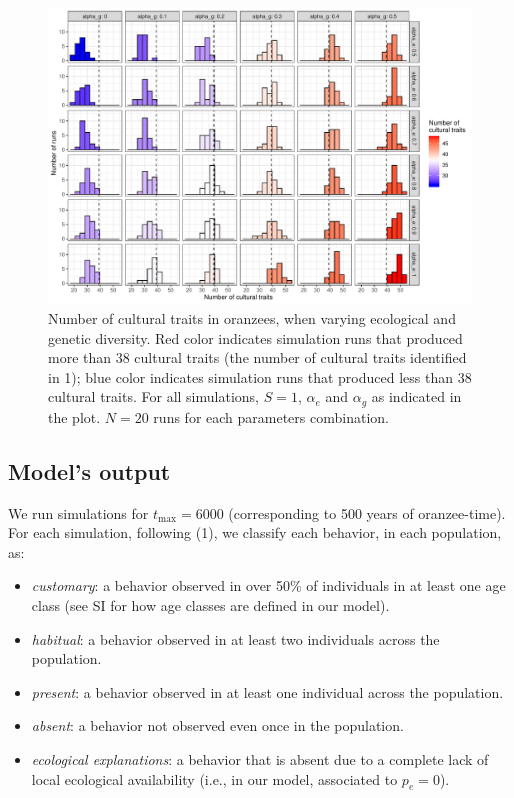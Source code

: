 \documentclass[9pt,twocolumn,twoside,]{pnas-new}
\begin{document}
\begin{figure}[h!]
\begin{center}
\includegraphics[width=11.8cm]{figures/figure_1.pdf}
\caption{Number of cultural traits in oranzees, when varying ecological and genetic diversity. Red color indicates simulation runs that produced more than 38 cultural traits (the number of cultural traits identified in 1); blue color indicates simulation runs that produced less than 38 cultural traits. For all simulations, $S=1$, $\alpha_e$ and $\alpha_g$ as indicated in the plot. $N=20$ runs for each parameters combination.}
\label{Figure1}
\end{center}
\end{figure}

\subsection*{Model's output}\label{format}

We run simulations for \(t_\text{max}=6000\) (corresponding to 500 years
of oranzee-time). For each simulation, following (1), we classify each
behavior, in each population, as:

\begin{itemize}
\item
  \emph{customary}: a behavior observed in over 50\% of individuals in
  at least one age class (see SI for how age classes are defined in our
  model).
\item
  \emph{habitual}: a behavior observed in at least two individuals
  across the population.
\item
  \emph{present}: a behavior observed in at least one individual across
  the population.
\item
  \emph{absent}: a behavior not observed even once in the population.
\item
  \emph{ecological explanations}: a behavior that is absent due to a
  complete lack of local ecological availability (i.e., in our model,
  associated to \(p_e=0\)).
\end{itemize}
\end{document}
